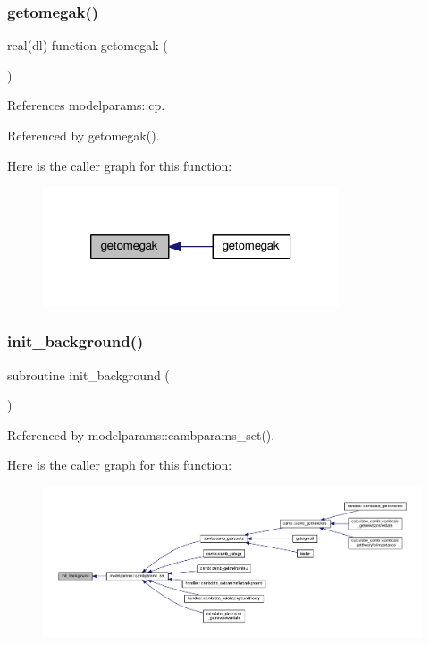\subsubsection{\texorpdfstring{getomegak()}{getomegak()}}
{\footnotesize\ttfamily real(dl) function getomegak (\begin{DoxyParamCaption}{ }\end{DoxyParamCaption})}



References modelparams\+::cp.



Referenced by getomegak().

Here is the caller graph for this function\+:
\nopagebreak
\begin{figure}[H]
\begin{center}
\leavevmode
\includegraphics[width=248pt]{equations_8f90_a2c95a3b42a68aa87a21097ce3ff8bbe6_icgraph}
\end{center}
\end{figure}
\mbox{\label{equations_8f90_a47540f6082acc64c78a1daac45637fd6}} 
\subsubsection{\texorpdfstring{init\+\_\+background()}{init\_background()}}
{\footnotesize\ttfamily subroutine init\+\_\+background (\begin{DoxyParamCaption}{ }\end{DoxyParamCaption})}



Referenced by modelparams\+::cambparams\+\_\+set().

Here is the caller graph for this function\+:
\nopagebreak
\begin{figure}[H]
\begin{center}
\leavevmode
\includegraphics[width=350pt]{equations_8f90_a47540f6082acc64c78a1daac45637fd6_icgraph}
\end{center}
\end{figure}
